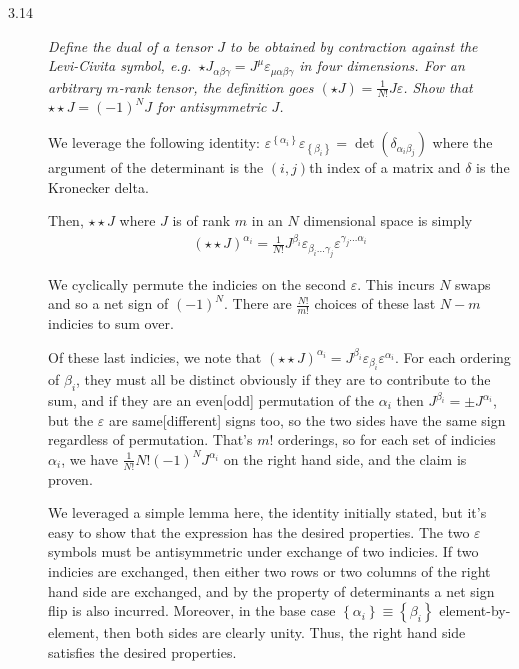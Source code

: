\documentclass[12pt]{report}
\begin{document}
\begin{description}
    \item[3.14] \emph{Define the \emph{dual} of a tensor $J$ to be obtained by
        contraction against the Levi-Civita symbol, e.g.\
        ${\star J}_{\alpha\beta\gamma} =
        {J^\mu}\varepsilon_{\mu\alpha\beta\gamma}$ in four dimensions. For an
        arbitrary $m$-rank tensor, the definition goes $(\star J) = \frac{1}{N!}
        J \varepsilon$. Show that $\star \star J = (-1)^N J$ for antisymmetric
        $J$.}

        We leverage the following identity:
        $\varepsilon^{\left\{ \alpha_i \right\}}
        \varepsilon_{\left\{ \beta_i \right\}} =
        \det\left( \delta_{\alpha_i\beta_j} \right)
        $ where the argument of the determinant is the $(i, j)$th index of a
        matrix and $\delta$ is the Kronecker delta.

        Then, $\star \star J$ where $J$ is of rank $m$ in an $N$ dimensional
        space is simply
        \begin{align*}
            (\star \star J)^{\alpha_i} = \frac{1}{N!}J^{\beta_i}
                \varepsilon_{\beta_i\dots \gamma_j}
                \varepsilon^{\gamma_j\dots \alpha_i}
        \end{align*}

        We cyclically permute the indicies on the second $\varepsilon$. This
        incurs $N$ swaps and so a net sign of $(-1)^N$. There are $\frac{N!}{m!
        }$ choices of these last $N-m$ indicies to sum over.

        Of these last indicies, we note that $(\star \star J)^{\alpha_i} =
        J^{\beta_i} \varepsilon_{\beta_i}\varepsilon^{\alpha_i}$. For each
        ordering of $\beta_i$, they must all be distinct obviously if they are
        to contribute to the sum, and if they are an even[odd] permutation of
        the $\alpha_i$ then $J^{\beta_i} = \pm J^{\alpha_i}$, but the
        $\varepsilon$ are same[different] signs too, so the two sides have the
        same sign regardless of permutation. That's $m!$ orderings, so for each
        set of indicies $\alpha_i$, we have $\frac{1}{N!}N!(-1)^NJ^{\alpha_i}$
        on the right hand side, and the claim is proven.

        We leveraged a simple lemma here, the identity initially stated, but
        it's easy to show that the expression has the desired properties. The
        two $\varepsilon$ symbols must be antisymmetric under exchange of two
        indicies. If two indicies are exchanged, then either two rows or two
        columns of the right hand side are exchanged, and by the property of
        determinants a net sign flip is also incurred. Moreover, in the base
        case $\left\{ \alpha_i \right\} \equiv \left\{ \beta_i \right\}$
        element-by-element, then both sides are clearly unity. Thus, the right
        hand side satisfies the desired properties.

\end{description}
\end{document}
